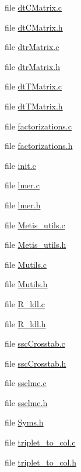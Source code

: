 \begin{CompactItemize}
file \hyperlink{dtCMatrix_8c}{dt\-CMatrix.c}
\item 
file \hyperlink{dtCMatrix_8h}{dt\-CMatrix.h}
\item 
file \hyperlink{dtrMatrix_8c}{dtr\-Matrix.c}
\item 
file \hyperlink{dtrMatrix_8h}{dtr\-Matrix.h}
\item 
file \hyperlink{dtTMatrix_8c}{dt\-TMatrix.c}
\item 
file \hyperlink{dtTMatrix_8h}{dt\-TMatrix.h}
\item 
file \hyperlink{factorizations_8c}{factorizations.c}
\item 
file \hyperlink{factorizations_8h}{factorizations.h}
\item 
file \hyperlink{init_8c}{init.c}
\item 
file \hyperlink{lmer_8c}{lmer.c}
\item 
file \hyperlink{lmer_8h}{lmer.h}
\item 
file \hyperlink{Metis__utils_8c}{Metis\_\-utils.c}
\item 
file \hyperlink{Metis__utils_8h}{Metis\_\-utils.h}
\item 
file \hyperlink{Mutils_8c}{Mutils.c}
\item 
file \hyperlink{Mutils_8h}{Mutils.h}
\item 
file \hyperlink{R__ldl_8c}{R\_\-ldl.c}
\item 
file \hyperlink{R__ldl_8h}{R\_\-ldl.h}
\item 
file \hyperlink{sscCrosstab_8c}{ssc\-Crosstab.c}
\item 
file \hyperlink{sscCrosstab_8h}{ssc\-Crosstab.h}
\item 
file \hyperlink{ssclme_8c}{ssclme.c}
\item 
file \hyperlink{ssclme_8h}{ssclme.h}
\item 
file \hyperlink{Syms_8h}{Syms.h}
\item 
file \hyperlink{triplet__to__col_8c}{triplet\_\-to\_\-col.c}
\item 
file \hyperlink{triplet__to__col_8h}{triplet\_\-to\_\-col.h}
\end{CompactItemize}
